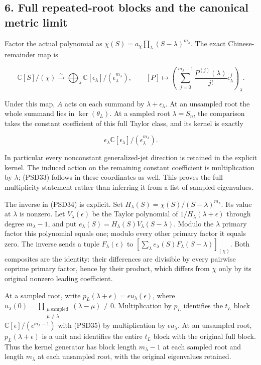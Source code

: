 \documentclass{article}
\begin{document}
\subsection{6. Full repeated-root blocks and the canonical metric limit}\label{full-repeated-root-blocks-and-the-canonical-metric-limit}

Factor the actual polynomial as \(\chi(S)=a_\chi\prod_\lambda(S-\lambda)^{m_\lambda}\). The exact Chinese-remainder map is

\[
\mathbb C[S]/(\chi)\xrightarrow{\sim}
\bigoplus_\lambda\mathbb C[\epsilon_\lambda]/(\epsilon_\lambda^{m_\lambda}),
\qquad
[P]\longmapsto
\left(\sum_{j=0}^{m_\lambda-1}\frac{P^{(j)}(\lambda)}{j!}\epsilon_\lambda^j\right)_\lambda.
\tag{PSD34}
\]

Under this map, \(A\) acts on each summand by \(\lambda+\epsilon_\lambda\). At an unsampled root the whole summand lies in \(\ker(\theta_L)\). At a sampled root \(\lambda=S_n\), the comparison takes the constant coefficient of this full Taylor class, and its kernel is exactly

\[
\epsilon_\lambda\mathbb C[\epsilon_\lambda]/(\epsilon_\lambda^{m_\lambda}).
\tag{PSD35}
\]

In particular every nonconstant generalized-jet direction is retained in the explicit kernel. The induced action on the remaining constant coefficient is multiplication by \(\lambda\); (PSD33) follows in these coordinates as well. This proves the full multiplicity statement rather than inferring it from a list of sampled eigenvalues.

The inverse in (PSD34) is explicit. Set \(H_\lambda(S)=\chi(S)/(S-\lambda)^{m_\lambda}\). Its value at \(\lambda\) is nonzero. Let \(V_\lambda(\epsilon)\) be the Taylor polynomial of \(1/H_\lambda(\lambda+\epsilon)\) through degree \(m_\lambda-1\), and put \(e_\lambda(S)=H_\lambda(S)V_\lambda(S-\lambda)\). Modulo the \(\lambda\) primary factor this polynomial equals one; modulo every other primary factor it equals zero. The inverse sends a tuple \(F_\lambda(\epsilon)\) to \(\left[\sum_\lambda e_\lambda(S)F_\lambda(S-\lambda)\right]_{(\chi)}\). Both composites are the identity: their differences are divisible by every pairwise coprime primary factor, hence by their product, which differs from \(\chi\) only by its original nonzero leading coefficient.

At a sampled root, write \(p_L(\lambda+\epsilon)=\epsilon u_\lambda(\epsilon)\), where \(u_\lambda(0)=\prod_{\substack{\mu\ \mathrm{sampled}\\\mu\ne\lambda}}(\lambda-\mu)\ne0\). Multiplication by \(p_L\) identifies the \(t_L\) block \(\mathbb C[\epsilon]/(\epsilon^{m_\lambda-1})\) with (PSD35) by multiplication by \(\epsilon u_\lambda\). At an unsampled root, \(p_L(\lambda+\epsilon)\) is a unit and identifies the entire \(t_L\) block with the original full block. Thus the kernel generator has block length \(m_\lambda-1\) at each sampled root and length \(m_\lambda\) at each unsampled root, with the original eigenvalues retained.
\end{document}
